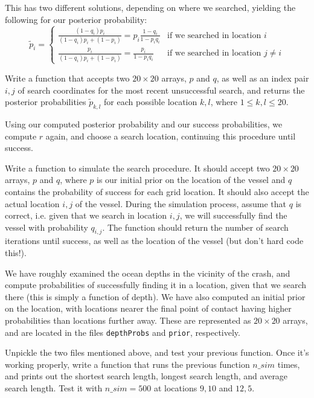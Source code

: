 This has two different solutions, depending on where we searched, yielding the following for our posterior probability:
\begin{equation*}
\tilde{p}_{i} = \begin{cases} \frac{(1-q_{i})p_{i}}{(1-q_{i})p_{i} + (1-p_{i})} = p_{i}\frac{1-q_{i}}{1-p_{i}q_{i}} & \mbox{if we searched in location } i \\ \frac{p_{i}}{(1-q_{i})p_{i} + (1-p_{i})} = \frac{p_{i}}{1-p_{i}q_{i}} & \mbox{if we searched in location } j \neq i \end{cases}
\end{equation*}

\begin{problem}
Write a function that accepts two $20 \times 20$ arrays, $p$ and $q$, as well as an index pair $i,j$ of search coordinates for the most recent unsuccessful search, and returns the posterior probabilities $\tilde{p}_{k,l}$ for each possible location $k,l$, where $1 \leq k,l \leq 20$.
\end{problem}

Using our computed posterior probability and our success probabilities, we compute $r$ again, and choose a search location, continuing this procedure until success.

\begin{problem}
Write a function to simulate the search procedure. It should accept two $20 \times 20$ arrays, $p$ and $q$, where $p$ is our initial prior on the location of the vessel and $q$ contains the probability of success for each grid location. It should also accept the actual location $i,j$ of the vessel. During the simulation process, assume that $q$ is correct, i.e. given that we search in location $i,j$, we will successfully find the vessel with probability $q_{i,j}$. The function should return the number of search iterations until success, as well as the location of the vessel (but don't hard code this!).
\end{problem}

We have roughly examined the ocean depths in the vicinity of the crash, and compute probabilities of successfully finding it in a location, given that we search there (this is simply a function of depth). We have also computed an initial prior on the location, with locations nearer the final point of contact having higher probabilities than locations further away. These are represented as $20 \times 20$ arrays, and are located in the files \texttt{depthProbs} and \texttt{prior}, respectively.

\begin{problem}
Unpickle the two files mentioned above, and test your previous function. Once it's working properly, write a function that runs the previous function $n\_sim$ times, and prints out the shortest search length, longest search length, and average search length. Test it with $n\_sim = 500$ at locations $9, 10$ and $12, 5$.
\end{problem}